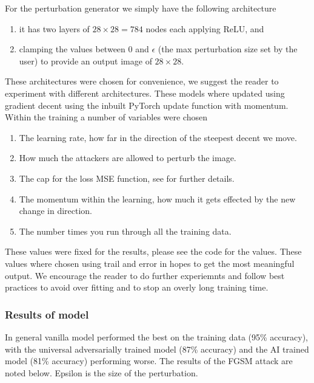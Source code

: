 For the perturbation generator we simply have the following architecture

\begin{enumerate}
	\item it has two layers of $28 \times 28 = 784$ nodes each applying ReLU, and
	\item clamping the values between 0 and $\epsilon$ (the max perturbation size set by the user) to provide an output image of $28 \times 28$.
\end{enumerate}

These architectures were chosen for convenience, we suggest the reader to experiment with different architectures. These models where updated using gradient decent using the inbuilt PyTorch update function with momentum.\\

Within the training a number of variables were chosen

\begin{enumerate}
	\item The learning rate, how far in the direction of the steepest decent we move.
	\item How much the attackers are allowed to perturb the image.
	\item The cap for the loss MSE function, see \cite{shafahi_universal_2018} for further details.	
	\item The momentum within the learning, how much it gets effected by the new change in direction.
	\item The number times you run through all the training data.
\end{enumerate}

These values were fixed for the results, please see the code for the values. These values where chosen using trail and error in hopes to get the most meaningful output. We encourage the reader to do further experiemnts and follow best practices to avoid over fitting and to stop an overly long training time.

\subsubsection{Results of model}

In general vanilla model performed the best on the training data (95\% accuracy), with the universal adversarially trained model (87\% accuracy) and the AI trained model (81\% accuracy) performing worse. The results of the FGSM attack are noted below. Epsilon is the size of the perturbation.

